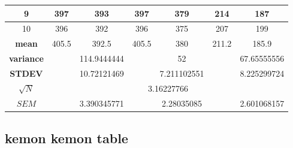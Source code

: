 \begin{table}[H]
\begin{tabular}{|c|c|c|c|c|c|c|}
9                                      & 397                 & 393                    & 397                 & 379                   & 214                  & 187                    \\ \hline
10                                     & 396                 & 392                    & 396                 & 375                   & 207                  & 199                    \\ \hline
\textbf{mean}                          & 405.5               & 392.5                    & 405.5               & 380                   & 211.2                & 185.9                  \\ \hline
\textbf{variance}                      &                     & 114.9444444            &                     & 52                    &                      & 67.65555556            \\ \hline
\textbf{STDEV}                         &                     & 10.72121469            &                     & 7.211102551           &                      & 8.225299724            \\ \hline
\textbf{$\sqrt{N}$}                    & \multicolumn{6}{c|}{3.16227766}                                                                                                            \\ \hline
\textbf{$SEM$}           &                     & 3.390345771            &                     & 2.28035085            &                      & 2.601068157            \\ \hline
\end{tabular}
\end{table}
\subsection{kemon kemon table}

